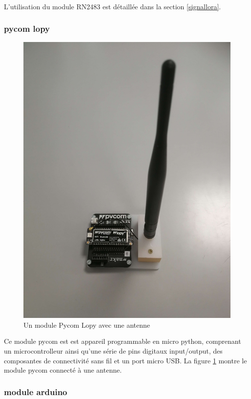 L'utilisation du module RN2483 est détaillée dans la section \ref{signallora}.

\subsubsection{pycom lopy}

\begin{figure}[h]
\centering

\includegraphics[scale=0.08]{images/lopy.png}
\caption{Un module Pycom Lopy avec une antenne}\label{term35}
\end{figure}

Ce module pycom est est appareil programmable en micro python, comprenant un microcontrolleur ainsi qu'une série de pins digitaux input/output,  des composantes de connectivité sans fil et un port micro USB. La figure \ref{term35} montre le module pycom connecté à une antenne.

\subsubsection{module arduino}\label{arduino}

